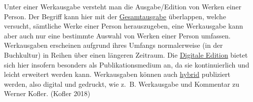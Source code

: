 \documentclass{article}
\begin{document}
    Unter einer Werkausgabe versteht man die Ausgabe/Edition von Werken einer Person. Der Begriff kann hier mit der \href{http://gams.uni-graz.at/o:konde.91}{Gesamtausgabe} überlappen, welche versucht, sämtliche Werke einer Person herauszugeben, eine Werkausgabe kann aber auch nur eine bestimmte Auswahl von Werken einer Person umfassen. \\
            
        Werkausgaben erscheinen aufgrund ihres Umfangs normalerweise (in der Buchkultur) in Reihen über einen längeren Zeitraum. Die \href{http://gams.uni-graz.at/o:konde.59}{Digitale Edition} bietet sich hier insofern besonders als Publikationsmedium an, da sie kontinuierlich und leicht erweitert werden kann. Werkausgaben können auch \href{http://gams.uni-graz.at/o:konde.96}{hybrid} publiziert werden, also digital und gedruckt, wie z. B. Werkausgabe und Kommentar zu Werner Kofler. (Kofler 2018)\\
            
\end{document}
